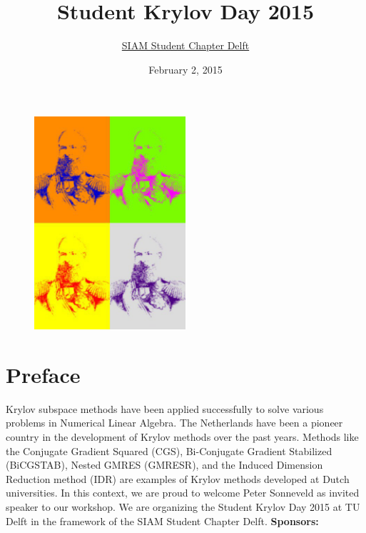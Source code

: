 \documentclass{article}
\title{\bf Student Krylov Day 2015}
\author{\href{http://sscdelft.github.io/activities/2015/02/02/krylov-day.html}{SIAM Student Chapter Delft}}
\date{February 2, 2015}
\begin{document}
\maketitle
\begin{figure}[h]
 \centering
 \includegraphics[width=0.5\textwidth]{krylov_warhol2.jpg} 
\end{figure}

\section*{Preface}
Krylov subspace methods have been applied successfully to solve various problems 
in Numerical Linear Algebra. The Netherlands have been a pioneer country in the development of Krylov methods over the past years.
Methods like the Conjugate Gradient Squared (CGS), Bi-Conjugate Gradient Stabilized (BiCG\-STAB), Nested GMRES (GMRESR), and the Induced Dimension Reduction method (IDR) are examples of Krylov methods developed at Dutch universities. In this context, we are proud to welcome Peter Sonneveld as invited speaker to our workshop.
We are organizing the Student Krylov Day 2015 at TU Delft in the framework of the SIAM Student Chapter Delft. 
\newpage
\thispagestyle{empty}
\null
\vfill
\noindent \textbf{Sponsors:}
\end{document}
